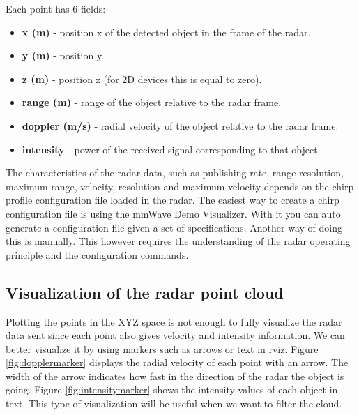 Each point has 6 fields:
\begin{itemize}
\item \textbf{x (m)} - position x of the detected  object in the frame of the radar.
\item \textbf{y (m)} - position y.
\item \textbf{z (m)} - position z (for 2D devices this is equal to zero).
\item \textbf{range (m)} - range of the object relative to the radar frame.
\item \textbf{doppler (m/s)} - radial velocity of the object relative to the radar frame.
\item \textbf{intensity} - power of the received signal corresponding to that object.
\end{itemize}

The characteristics of the \ac{radar} data, such as publishing rate, range resolution, maximum range, velocity, resolution and maximum velocity depends on the chirp profile configuration file loaded in the \ac{radar}.
The easiest way to create a chirp configuration file is using the mmWave Demo Visualizer. With it you can auto generate a configuration file given a set of specifications.
Another way of doing this is manually. This however requires the understanding of the radar operating principle and the configuration commands.





\subsection{Visualization of the radar point cloud}
Plotting the points in the XYZ space is not enough to fully visualize the radar data sent since each point also gives velocity and intensity information. We can better visualize it by using markers such as arrows or text in rviz.
Figure \ref{fig:dopplermarker} displays the radial velocity of each point with an arrow. The width of the arrow indicates how fast in the direction  of the radar the object is going. Figure \ref{fig:intensitymarker} shows the intensity values of each object in text. This type of visualization will be useful when we want to filter the cloud.


